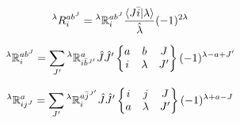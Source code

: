 \documentclass[thesis.tex]{subfiles}
\begin{document}
\begin{equation}
  {}^{\lambda}R^{ab^{J}}_{i} = {}^{\lambda}\mathbb{R}^{ab^{J}}_{i}\frac{\langle J\bar{i} | \lambda\rangle}{\hat{\lambda}}(-1)^{2\lambda}
\end{equation}

\begin{equation}
  {}^{\lambda}\mathbb{R}^{ab^{J}}_{i} = \sum_{J'}{}^{\lambda}\mathbb{R}^{a}_{i\bar{b}^{J'}}\hat{J}\hat{J}'\begin{Bmatrix} a & b & J \\ i & \lambda & J' \end{Bmatrix}(-1)^{\lambda - a + J'}
\end{equation}

\begin{equation}
  {}^{\lambda}\mathbb{R}^{a}_{ij^{J}} = \sum_{J'}{}^{\lambda}\mathbb{R}^{a\bar{j}^{J'}}_{i}\hat{J}\hat{J}'\begin{Bmatrix} i & j & J \\ a & \lambda & J' \end{Bmatrix}(-1)^{\lambda + a - J}
\end{equation}
\end{document}
